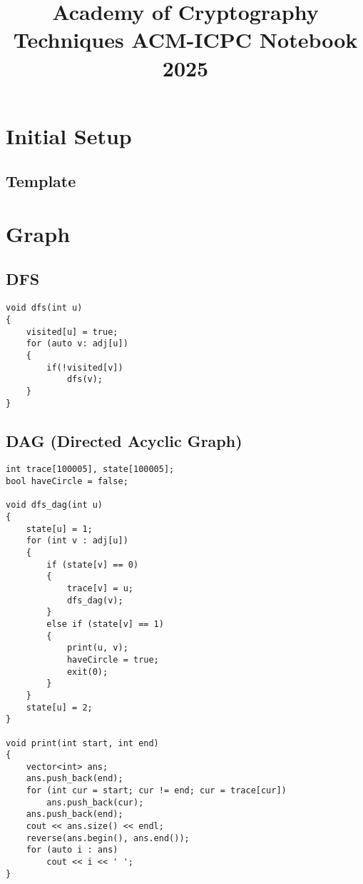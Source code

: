 \documentclass[10pt]{article}
\title{\vspace{-4ex}\Large{Academy of Cryptography Techniques ACM-ICPC Notebook 2025}}
\author{}
\date{}
\begin{document}
\begin{landscape}
\begin{multicols}{2}

\maketitle
\vspace{-13ex}
\tableofcontents
\pagestyle{fancy}

\section{Initial Setup}
\subsection{Template}


\section{Graph}
\subsection{DFS}
\begin{lstlisting}[style=cpp]
void dfs(int u)
{
    visited[u] = true;
    for (auto v: adj[u])
    {
        if(!visited[v])
            dfs(v);
    }
}
\end{lstlisting}

\subsection{DAG (Directed Acyclic Graph)}
\begin{lstlisting}[style=cpp]
int trace[100005], state[100005];
bool haveCircle = false;

void dfs_dag(int u)
{
    state[u] = 1;
    for (int v : adj[u])
    {
        if (state[v] == 0)
        {
            trace[v] = u;
            dfs_dag(v);
        }
        else if (state[v] == 1)
        {
            print(u, v);
            haveCircle = true;
            exit(0);
        }
    }
    state[u] = 2;
}

void print(int start, int end)
{
    vector<int> ans;
    ans.push_back(end);
    for (int cur = start; cur != end; cur = trace[cur])
        ans.push_back(cur);
    ans.push_back(end);
    cout << ans.size() << endl;
    reverse(ans.begin(), ans.end());
    for (auto i : ans)
        cout << i << ' ';
}
\end{lstlisting}


\end{multicols}
\end{landscape}
\end{document}
